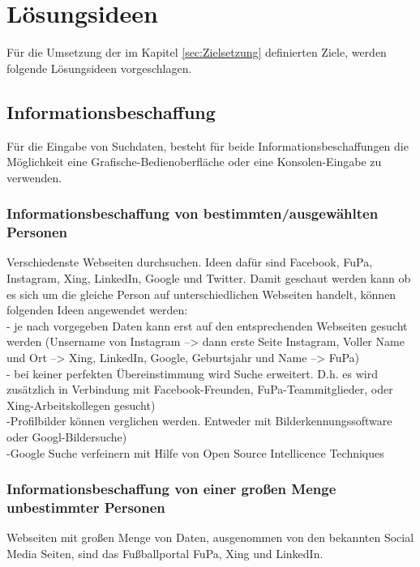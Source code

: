 
\chapter{Lösungsideen}  %
\label{cha:Lösungsideen} %
Für die Umsetzung der im Kapitel \ref{sec:Zielsetzung} definierten Ziele, werden folgende Lösungsideen vorgeschlagen.

\section{Informationsbeschaffung} %
Für die Eingabe von Suchdaten, besteht für beide Informationsbeschaffungen die Möglichkeit eine Grafische-Bedienoberfläche oder eine Konsolen-Eingabe zu verwenden.
	\subsection{Informationsbeschaffung von bestimmten/ausgewählten Personen}
	Verschiedenste Webseiten durchsuchen. Ideen dafür sind Facebook, FuPa, Instagram, Xing, LinkedIn, Google und Twitter. Damit geschaut werden kann ob es sich um die gleiche Person auf unterschiedlichen Webseiten handelt, können folgenden Ideen angewendet werden:\\
		- je nach vorgegeben Daten kann erst auf den entsprechenden Webseiten gesucht werden (Unsername von Instagram --> dann erste Seite Instagram, Voller Name und Ort --> Xing, LinkedIn, Google, Geburtsjahr und Name --> FuPa)\\
		- bei keiner perfekten Übereinstimmung wird Suche erweitert. D.h. es wird zusätzlich in Verbindung mit Facebook-Freunden, FuPa-Teammitglieder, oder Xing-Arbeitskollegen gesucht)\\
		-Profilbilder können verglichen werden. Entweder mit Bilderkennungssoftware oder Googl-Bildersuche)\\
		-Google Suche verfeinern mit Hilfe von Open Source Intellicence Techniques
		
	\subsection{Informationsbeschaffung von einer großen Menge unbestimmter Personen}
	Webseiten mit großen Menge von Daten, ausgenommen von den bekannten Social Media Seiten, sind das Fußballportal FuPa, Xing und LinkedIn.
	
